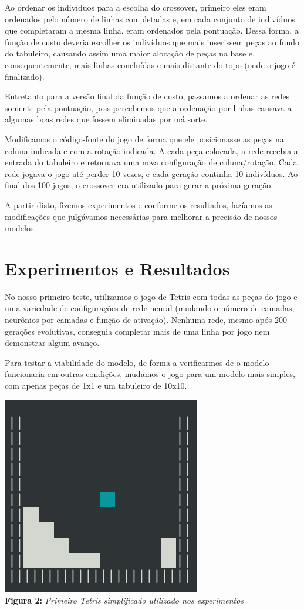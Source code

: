 \documentclass[conference]{IEEEtran}
\begin{document}
Ao ordenar os indivíduos para a escolha do crossover, primeiro eles eram ordenados pelo número de linhas completadas e, em cada conjunto de indivíduos que completaram a mesma linha, eram ordenados pela pontuação. Dessa forma, a função de custo deveria escolher os indivíduos que mais inserissem peças ao fundo do tabuleiro, causando assim uma maior alocação de peças na base e, consequentemente, mais linhas concluídas e mais distante do topo (onde o jogo é finalizado).

Entretanto para a versão final da função de custo, passamos a ordenar as redes somente pela pontuação, pois percebemos que a ordenação por linhas causava a algumas boas redes que fossem eliminadas por má sorte.

Modificamos o código-fonte do jogo de forma que ele posicionasse as peças na coluna indicada e com a rotação indicada. A cada peça colocada, a rede recebia a entrada do tabuleiro e retornava uma nova configuração de coluna/rotação. Cada rede jogava o jogo até perder 10 vezes, e cada geração continha 10 indivíduos. Ao final dos 100 jogos, o crossover era utilizado para gerar a próxima geração.

A partir disto, fizemos experimentos e conforme os resultados, fazíamos as modificações que julgávamos necessárias para melhorar a precisão de nossos modelos.

\section{Experimentos e Resultados}
No nosso primeiro teste, utilizamos o jogo de Tetris com todas as peças do jogo e uma variedade de configurações de rede neural (mudando o número de camadas, neurônios por camadas e função de ativação). Nenhuma rede, mesmo após 200 gerações evolutivas, conseguia completar mais de uma linha por jogo nem demonstrar algum avanço. 

Para testar a viabilidade do modelo, de forma a verificarmos de o modelo funcionaria em outras condições, mudamos o jogo para um modelo mais simples, com apenas peças de 1x1 e um tabuleiro de 10x10.

\begin{center}
\includegraphics[scale=0.3]{tetris_simples.png}\\

\textbf{Figura 2:} \textit{Primeiro Tetris simplificado utilizado nos experimentos}
\end{center}
\end{document}
